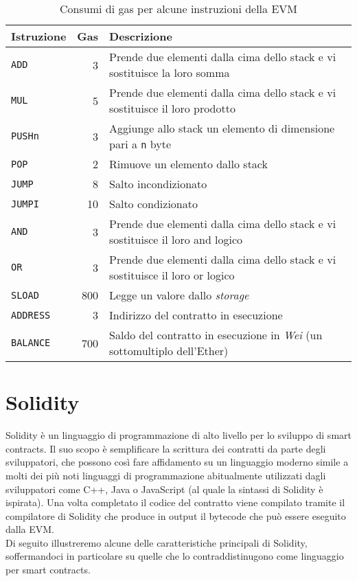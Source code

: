 \documentclass[12pt,a4paper,openright,oneside]{report}
\theoremstyle{definition}
\begin{document}
\begin{table}[t]
    \centering
    \begin{tabular}{|l|r|m{25em}|}
        \hline
        Istruzione & Gas & Descrizione \\
        \hline
        \texttt{ADD} & 3 & Prende due elementi dalla cima dello stack e vi sostituisce la loro somma \\
        \hline
        \texttt{MUL} & 5 & Prende due elementi dalla cima dello stack e vi sostituisce il loro prodotto \\
        \hline
        \texttt{PUSHn} & 3 & Aggiunge allo stack un elemento di dimensione pari a \texttt{n} byte \\
        \hline
        \texttt{POP} & 2 & Rimuove un elemento dallo stack \\
        \hline
        \texttt{JUMP} & 8 & Salto incondizionato \\
        \hline
        \texttt{JUMPI} & 10 & Salto condizionato \\
        \hline
        \texttt{AND} & 3 & Prende due elementi dalla cima dello stack e vi sostituisce il loro and logico \\
        \hline
        \texttt{OR} & 3 & Prende due elementi dalla cima dello stack e vi sostituisce il loro or logico \\
        \hline
        \texttt{SLOAD} & 800 & Legge un valore dallo \textit{storage} \\
        \hline
        \texttt{ADDRESS} & 3 & Indirizzo del contratto in esecuzione \\
        \hline
        \texttt{BALANCE} & 700 & Saldo del contratto in esecuzione in \textit{Wei} (un sottomultiplo dell'Ether) \\
        \hline
    \end{tabular}
    \caption{Consumi di gas per alcune instruzioni della EVM}
    \label{table:bg:ethereum:gas:costs}
\end{table}

\section{Solidity}\label{bg:solidity}
Solidity \`{e} un linguaggio di programmazione di alto livello per lo sviluppo di smart contracts. Il suo scopo \`{e} semplificare la scrittura dei contratti da parte degli sviluppatori, che possono cos\`{i} fare affidamento su un linguaggio moderno simile a molti dei pi\`{u} noti linguaggi di programmazione abitualmente utilizzati dagli sviluppatori come C++, Java o JavaScript (al quale la sintassi di Solidity \`{e} ispirata).
Una volta completato il codice del contratto viene compilato tramite il compilatore di Solidity \cite{solc} che produce in output il bytecode che pu\`{o} essere eseguito dalla EVM.\\
Di seguito illustreremo alcune delle caratteristiche principali di Solidity, soffermandoci in particolare su quelle che lo contraddistinugono come linguaggio per smart contracts.
\end{document}
